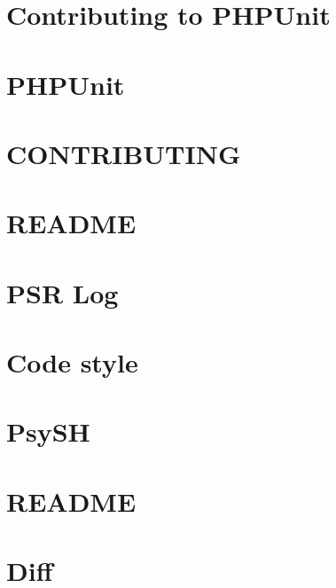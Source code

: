 \documentclass[twoside]{book}
\newcommand{\+}{\discretionary{\mbox{\scriptsize$\hookleftarrow$}}{}{}}
\begin{document}
\chapter{Contributing to P\+H\+P\+Unit}
\label{md_vendor_phpunit_phpunit__c_o_n_t_r_i_b_u_t_i_n_g}

\chapter{P\+H\+P\+Unit}
\label{md_vendor_phpunit_phpunit__r_e_a_d_m_e}

\chapter{C\+O\+N\+T\+R\+I\+B\+U\+T\+I\+N\+G}
\label{md_vendor_phpunit_phpunit-mock-objects__c_o_n_t_r_i_b_u_t_i_n_g}

\chapter{R\+E\+A\+D\+M\+E}
\label{md_vendor_phpunit_phpunit-mock-objects__r_e_a_d_m_e}

\chapter{P\+S\+R Log}
\label{md_vendor_psr_log__r_e_a_d_m_e}

\chapter{Code style}
\label{md_vendor_psy_psysh__c_o_n_t_r_i_b_u_t_i_n_g}

\chapter{Psy\+S\+H}
\label{md_vendor_psy_psysh__r_e_a_d_m_e}

\chapter{R\+E\+A\+D\+M\+E}
\label{md_vendor_sebastian_comparator__r_e_a_d_m_e}

\chapter{Diff}
\label{md_vendor_sebastian_diff__r_e_a_d_m_e}

\end{document}
